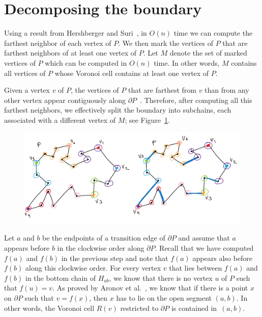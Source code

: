 \documentclass[a4paper,UKenglish]{lipics}
\newcommand{\ff}[1]{\ensuremath{f(#1)}}
\begin{document}
\section{Decomposing the boundary}

Using a result from Hershberger and Suri~\cite{hershberger1993matrix}, in $O(n)$ time we can compute the farthest neighbor of each vertex of $P$.
We then mark the vertices of $P$ that are farthest neighbors of at least one vertex of $P$.
Let $M$ denote the set of marked vertices of $P$ which can be computed in $O(n)$ time.
In other words, $M$ contains all vertices of $P$ whose Voronoi cell contains at least one vertex of $P$.

Given a vertex $v$ of $P$, the vertices of $P$ that are farthest from $v$ than from any other vertex appear contiguously along $\partial P$~\cite{aronov1993furthest}. Therefore, after computing all this farthest neighbors, we effectively split the boundary into subchains, each associated with a different vertex of $M$; see Figure~\ref{fig:Marked vertices decomposition}.

\begin{figure}[tb]
\centering
\includegraphics[width=1\textwidth]{img/MarkedVertices.pdf}
\caption{\small }
\label{fig:Marked vertices decomposition}
\end{figure}

Let $a$ and $b$ be the endpoints of a transition edge of $\partial P$ and assume that $a$ appears before $b$ in the clockwise order along $\partial P$. Recall that we have computed $\ff{a}$ and $\ff{b}$ in the previous step and note that $\ff{a}$ appears also before $\ff{b}$ along this clockwise order. 
For every vertex $v$ that lies between $\ff{a}$ and $\ff{b}$ in the bottom chain of $H_{ab}$, we know that there is no vertex $u$ of $P$ such that $\ff{u} = v$.
As proved by Aronov et al.~\cite[Corollary 2.7.4]{aronov1993furthest}, we know that if there is a point $x$ on $\partial P$ such that $v = \ff{x}$, then $x$ has to lie on the open segment $(a,b)$. 
In other words, the Voronoi cell $R(v)$ restricted to $\partial P$ is contained in~$(a,b)$.
\end{document}
